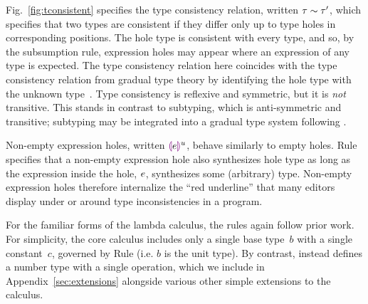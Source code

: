 

Fig.~\ref{fig:tconsistent} specifies the type consistency relation, written $\tau \sim \tau'$, which specifies that two types are consistent if they differ only up to type holes in corresponding positions.
%
The hole type is consistent with every type, and so, by the subsumption rule, expression holes may appear where an expression of any type is expected. The type consistency relation here coincides with the type consistency relation from gradual type theory by identifying the hole type with the unknown type~\cite{Siek06a}.
%
Type consistency is reflexive and symmetric, but it is \emph{not} transitive.
%
This stands in contrast to subtyping, which is anti-symmetric and transitive; subtyping may be integrated into a gradual type system following \citet{Siek:2007qy}.

Non-empty expression holes, written $\textcolor{violet}{\llparenthesis}e\textcolor{violet}{\rrparenthesis}^{u}$, behave similarly to empty holes.
%
Rule  specifies that a non-empty expression hole also synthesizes hole type as long as the expression inside the hole, $e$, synthesizes some (arbitrary) type.
%
Non-empty expression holes therefore internalize the ``red underline'' that many editors display under or around type inconsistencies in a program.

For the familiar forms of the lambda calculus, the rules again follow prior work.
%
For simplicity, the core calculus includes only a single base type~$b$ with a single constant~$c$, governed by Rule  (i.e. $b$ is the unit type).
%
By contrast, \Hazelnut instead defines a number type with a single operation, which we include in Appendix~\ref{sec:extensions} alongside various other simple extensions to the calculus. 
%

